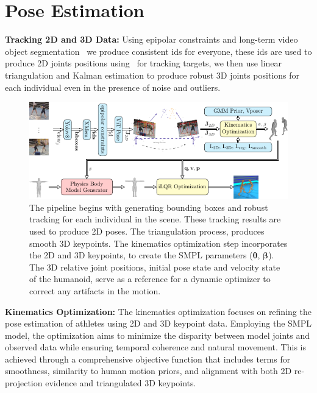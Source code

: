 \documentclass{egpubl}
\begin{document}
\section{Pose Estimation}


\textbf{Tracking 2D and 3D Data:} Using epipolar constraints and long-term video object segmentation~\cite{cheng2022xmem} we produce consistent ids for everyone, these ids are used to produce 2D joints positions using~\cite{xu2022vitpose} for tracking targets, we then use linear triangulation and Kalman estimation to produce robust 3D joints positions for each individual even in the presence of noise and outliers.   
\begin{figure}[!ht]
\includegraphics[width=0.75\linewidth]{pipeline.pdf}
 \centering
  \caption{The pipeline begins with generating bounding boxes  and robust tracking  for each individual in the scene. These tracking results are used to produce 2D poses. The triangulation process, produces smooth 3D keypoints. The kinematics optimization step incorporates the 2D and 3D keypoints, to create the SMPL parameters ($\mathbf{\theta}$, $\mathbf{\beta}$). The 3D relative joint positions, initial pose state  and velocity state of the humanoid, serve as a reference for a dynamic optimizer to correct any artifacts in the motion.}
  \label{fig:pipeline}
\end{figure}


\textbf{Kinematics Optimization:} The kinematics optimization focuses on refining the pose estimation of athletes using 2D and 3D keypoint data. Employing the SMPL model, the optimization aims to minimize the disparity between model joints and observed data while ensuring temporal coherence and natural movement. This is achieved through a comprehensive objective function that includes terms for smoothness, similarity to human motion priors, and alignment with both 2D re-projection evidence and triangulated 3D keypoints.
\end{document}
